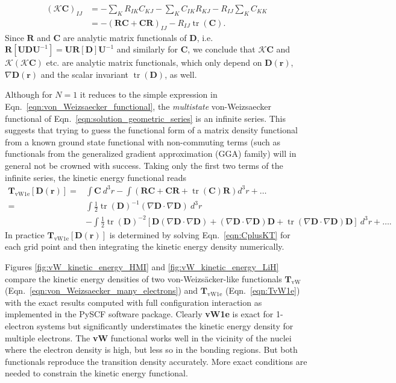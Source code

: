 \documentclass[journal=jpclcd,manuscript=letter]{achemso}
\DeclareMathOperator{\tr}{tr}
\newcommand\m[1]{\mathbf{#1}}
\renewcommand\vec[1]{\mathbf{#1}}
\begin{document}
\begin{equation}
\begin{split}
  (\mathcal{K} \vec{C})_{IJ} &= -\sum_{K} R_{IK} C_{KJ} - \sum_{K} C_{IK} R_{KJ} - R_{IJ} \sum_K C_{KK} \\
   &= - (\m{R} \m{C} + \m{C} \m{R})_{IJ} - R_{IJ} \tr(\m{C}).
\end{split}
\end{equation}
Since $\m{R}$ and $\m{C}$ are analytic matrix functionals of $\m{D}$, i.e. $\m{R}[\m{U} \m{D} \m{U}^{-1}] = \m{U} \m{R}[\m{D}] \m{U}^{-1}$ and similarly for $\m{C}$,
we conclude that $\mathcal{K} \vec{C}$ and $\mathcal{K} (\mathcal{K} \vec{C})$ etc. are analytic matrix functionals, which only depend on $\m{D}(\vec{r})$, $\nabla \m{D}(\vec{r})$ and the scalar invariant $\tr(\m{D})$, as well.

Although for $N=1$ it reduces to the simple expression in Eqn.~\ref{eqn:von_Weizsaecker_functional},
the \emph{multistate} von-Weizsaecker functional of Eqn.~\ref{eqn:solution_geometric_series} is an infinite series. 
This suggests that trying to guess the functional form of a matrix density functional from a known ground state functional
with non-commuting terms (such as functionals from the generalized gradient approximation (GGA) family)
will in general not be crowned with success.
Taking only the first two terms of the infinite series, the kinetic energy functional reads
\begin{equation}
\begin{split}
  \m{T}_{\text{vW1e}}[\m{D}(\vec{r})] =& \int \m{C} ~ d^3\!r  - \int \left(\m{R} \m{C} + \m{C} \m{R} + \tr(\m{C}) \m{R} \right) d^3\!r  + \ldots \\
  =& \int \frac{1}{2} \tr(\m{D})^{-1} (\nabla \m{D} \cdot \nabla \m{D}) ~ d^3\!r \\
  & - \int \frac{1}{2} \tr(\m{D})^{-2} \left[ \m{D} (\nabla \m{D} \cdot \nabla \m{D}) + (\nabla \m{D} \cdot \nabla \m{D}) \m{D} + \tr(\nabla \m{D} \cdot \nabla \m{D}) \m{D} \right] ~ d^3\!r + \ldots .
\end{split}
\label{eqn:TvW1e}
\end{equation}
In practice $\m{T}_{\text{vW1e}}[\m{D}(\vec{r})]$ is determined by solving Eqn.~\ref{eqn:CplusKT} for
each grid point and then integrating the kinetic energy density numerically.

Figures \ref{fig:vW_kinetic_energy_HMI} and \ref{fig:vW_kinetic_energy_LiH} compare the kinetic energy densities
of two von-Weizs\"{a}cker-like functionals $\m{T}_{\text{vW}}$ (Eqn.~\ref{eqn:von_Weizsaecker_many_electrons})
and $\m{T}_{\text{vW1e}}$ (Eqn.~\ref{eqn:TvW1e}) with the exact results
computed with full configuration interaction as implemented in the PySCF \cite{Sun2020} software package. Clearly \textbf{vW1e} is exact for 1-electron systems
but significantly understimates the kinetic energy density for multiple electrons.
The \textbf{vW} functional works well in the vicinity of the nuclei where the electron density is high, but less so in the bonding regions.
But both functionals reproduce the transition density accurately.
More exact conditions are needed to constrain the kinetic energy functional.
\end{document}
